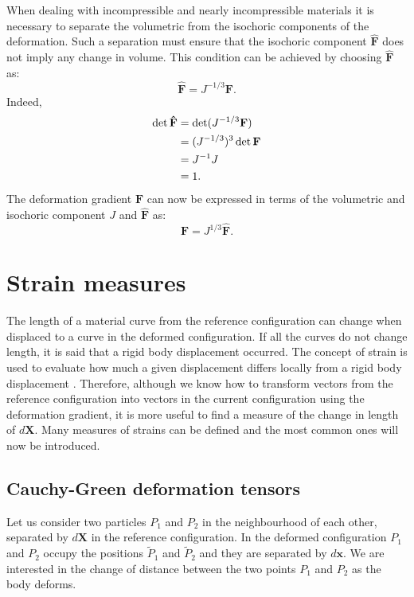 When dealing with incompressible and nearly incompressible materials it is necessary to separate the volumetric from the isochoric components of the deformation. Such a separation must ensure that the isochoric component $\mathbf{\hat{F}}$ does not imply any change in volume. This condition can be achieved by choosing $\mathbf{\hat{F}}$ as:
\begin{equation}
\mathbf{\hat{F}} = J^{-1/3} \mathbf{F}.
\end{equation}
Indeed,
\begin{align}
\det \mathbf{\hat{F}} &= \det (J^{-1/3} \mathbf{F}) \notag \\
&= (J^{-1/3})^3 \det \mathbf{F} \notag \\
&= J^{-1} J \notag \\
&= 1.
\end{align}
The deformation gradient $\mathbf{F}$ can now be expressed in terms of the volumetric and isochoric component $J$ and $\mathbf{\hat{F}}$ as:
\begin{equation}
\mathbf{F} = J^{1/3} \mathbf{\hat{F}}.
\end{equation}
			
			
\section{Strain measures}	\label{chap2:strainMeasures}
The length of a material curve from the reference configuration can change when displaced to a curve in the deformed configuration. If all the curves do not change length, it is said that a rigid body displacement occurred. The concept of strain is used to evaluate how much a given displacement differs locally from a rigid body displacement \citep{Lubliner06}. Therefore, although we know how to transform vectors from the reference configuration into vectors in the current configuration using the deformation gradient, it is more useful to find a measure of the change in length of $d\mathbf{X}$. Many measures of strains can be defined and the most common ones will now be introduced. 

	\subsection{Cauchy-Green deformation tensors}
Let us consider two particles $P_{1}$ and $P_{2}$ in the neighbourhood of each other, separated by $d\mathbf{X}$ in the reference configuration. In the deformed configuration $P_{1}$ and $P_{2}$ occupy the positions $\tilde{P}_{1}$ and $\tilde{P}_{2}$ and they are separated by $d\mathbf{x}$. We are interested in the change of distance between the two points $P_{1}$ and $P_{2}$ as the body deforms. 

